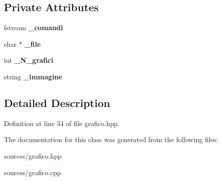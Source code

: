 \subsection*{Private Attributes}
\begin{DoxyCompactItemize}
\item 
\hypertarget{classGrafico_a92d61d84ee22b7baa82aa755a7dece87}{
fstream {\bfseries \_\-comandi}}
\label{classGrafico_a92d61d84ee22b7baa82aa755a7dece87}

\item 
\hypertarget{classGrafico_aaec41fc74fff525a7ecbc4e0d3971cc5}{
char $\ast$ {\bfseries \_\-file}}
\label{classGrafico_aaec41fc74fff525a7ecbc4e0d3971cc5}

\item 
\hypertarget{classGrafico_aa051b59955412fea00373b3af09d2fc6}{
int {\bfseries \_\-N\_\-grafici}}
\label{classGrafico_aa051b59955412fea00373b3af09d2fc6}

\item 
\hypertarget{classGrafico_a31add51cf1e043c1fd44eb116f4c7ed1}{
string {\bfseries \_\-immagine}}
\label{classGrafico_a31add51cf1e043c1fd44eb116f4c7ed1}

\end{DoxyCompactItemize}


\subsection{Detailed Description}


Definition at line 34 of file grafico.hpp.



The documentation for this class was generated from the following files:\begin{DoxyCompactItemize}
\item 
sources/grafico.hpp\item 
sources/grafico.cpp\end{DoxyCompactItemize}
